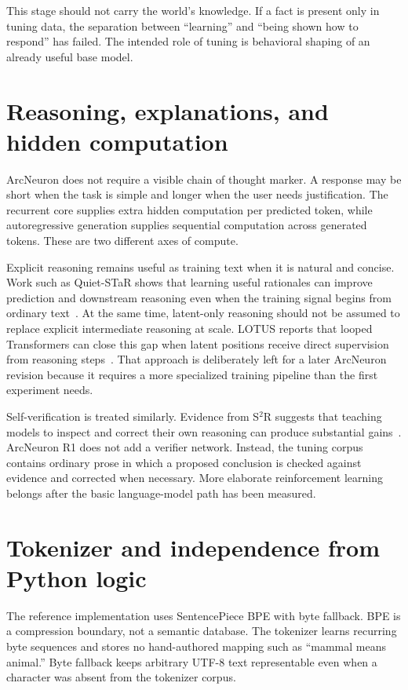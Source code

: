 \documentclass[10pt]{article}
\begin{document}
This stage should not carry the world's knowledge. If a fact is present only in tuning data, the separation between ``learning'' and ``being shown how to respond'' has failed. The intended role of tuning is behavioral shaping of an already useful base model.

\section{Reasoning, explanations, and hidden computation}

ArcNeuron does not require a visible chain of thought marker. A response may be short when the task is simple and longer when the user needs justification. The recurrent core supplies extra hidden computation per predicted token, while autoregressive generation supplies sequential computation across generated tokens. These are two different axes of compute.

Explicit reasoning remains useful as training text when it is natural and concise. Work such as Quiet-STaR shows that learning useful rationales can improve prediction and downstream reasoning even when the training signal begins from ordinary text~\cite{zelikman2024quietstar}. At the same time, latent-only reasoning should not be assumed to replace explicit intermediate reasoning at scale. LOTUS reports that looped Transformers can close this gap when latent positions receive direct supervision from reasoning steps~\cite{fan2026lotus}. That approach is deliberately left for a later ArcNeuron revision because it requires a more specialized training pipeline than the first experiment needs.

Self-verification is treated similarly. Evidence from S$^2$R suggests that teaching models to inspect and correct their own reasoning can produce substantial gains~\cite{ma2025s2r}. ArcNeuron R1 does not add a verifier network. Instead, the tuning corpus contains ordinary prose in which a proposed conclusion is checked against evidence and corrected when necessary. More elaborate reinforcement learning belongs after the basic language-model path has been measured.

\section{Tokenizer and independence from Python logic}

The reference implementation uses SentencePiece BPE with byte fallback. BPE is a compression boundary, not a semantic database. The tokenizer learns recurring byte sequences and stores no hand-authored mapping such as ``mammal means animal.'' Byte fallback keeps arbitrary UTF-8 text representable even when a character was absent from the tokenizer corpus.
\end{document}
